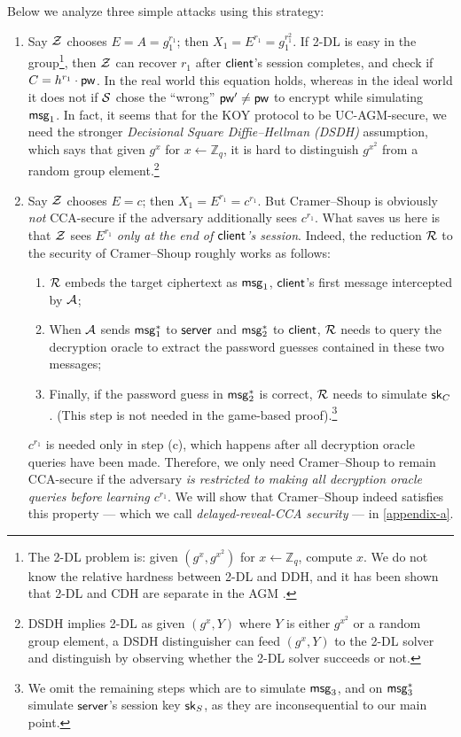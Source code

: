Below we analyze three simple attacks using this strategy:
\begin{enumerate}
	\item Say $\mathcal{Z}$ chooses $E = A = g_1^{r_1}$; then $X_1 = E^{r_1} = g_1^{r_1^2}$. If 2-DL is easy in the group\footnote{The 2-DL problem is: given $(g^x,g^{x^2})$ for $x \gets \mathbb{Z}_q$, compute $x$. We do not know the relative hardness between 2-DL and DDH, and it has been shown that 2-DL and CDH are separate in the AGM \cite{C:BauFucLos20}.}, then $\mathcal{Z}$ can recover $r_1$ after $\mathsf{client}$'s session completes, and check if $C = h^{r_1} \cdot \mathsf{pw}$. In the real world this equation holds, whereas in the ideal world it does not if $\mathcal{S}$ chose the ``wrong'' $\mathsf{pw}' \neq \mathsf{pw}$ to encrypt while simulating $\mathsf{msg}_{1}$. In fact, it seems that for the KOY protocol to be UC-AGM-secure, we need the stronger \emph{Decisional Square Diffie--Hellman (DSDH)} assumption, which says that given $g^x$ for $x \gets \mathbb{Z}_q$, it is hard to distinguish $g^{x^2}$ from a random group element.\footnote{DSDH implies 2-DL as given $(g^x,Y)$ where $Y$ is either $g^{x^2}$ or a random group element, a DSDH distinguisher can feed $(g^x,Y)$ to the 2-DL solver and distinguish by observing whether the 2-DL solver succeeds or not.}
	\item Say $\mathcal{Z}$ chooses $E = c$; then $X_1 = E^{r_1} = c^{r_1}$. But Cramer--Shoup is obviously \emph{not} CCA-secure if the adversary additionally sees $c^{r_1}$. What saves us here is that $\mathcal{Z}$ sees $E^{r_1}$ \emph{only at the end of $\mathsf{client}$'s session}. Indeed, the reduction $\mathcal{R}$ to the security of Cramer--Shoup roughly works as follows:
	\begin{enumerate}
		\item $\mathcal{R}$ embeds the target ciphertext as $\mathsf{msg}_{1}$, $\mathsf{client}$'s first message intercepted by $\mathcal{A}$;
		\item When $\mathcal{A}$ sends $\mathsf{msg}_{1}^*$ to $\mathsf{server}$ and $\mathsf{msg}_{2}^*$ to $\mathsf{client}$, $\mathcal{R}$ needs to query the decryption oracle to extract the password guesses contained in these two messages;
		\item Finally, if the password guess in $\mathsf{msg}_{2}^*$ is correct, $\mathcal{R}$ needs to simulate $\mathsf{sk}_C$. (This step is not needed in the game-based proof).\footnote{We omit the remaining steps which are to simulate $\mathsf{msg}_{3}$, and on $\mathsf{msg}_{3}^*$ simulate $\mathsf{server}$'s session key $\mathsf{sk}_S$, as they are inconsequential to our main point.}
	\end{enumerate}
	$c^{r_1}$ is needed only in step (c), which happens after all decryption oracle queries have been made. Therefore, we only need Cramer--Shoup to remain CCA-secure if the adversary \emph{is restricted to making all decryption oracle queries before learning $c^{r_1}$}. We will show that Cramer--Shoup indeed satisfies this property --- which we call \emph{delayed-reveal-CCA security} --- in \cref{appendix-a}.

\end{enumerate}
